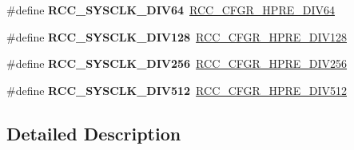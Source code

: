 \begin{DoxyCompactItemize}
\item 
\#define {\bfseries R\+C\+C\+\_\+\+S\+Y\+S\+C\+L\+K\+\_\+\+D\+I\+V64}~\hyperlink{group___peripheral___registers___bits___definition_ga1caeba8dc2b4c0bb11be600e983e3370}{R\+C\+C\+\_\+\+C\+F\+G\+R\+\_\+\+H\+P\+R\+E\+\_\+\+D\+I\+V64}\hypertarget{group___r_c_c___a_h_b___clock___source_ga73814b5a7ee000687ec8334637ca5b14}{}\label{group___r_c_c___a_h_b___clock___source_ga73814b5a7ee000687ec8334637ca5b14}

\item 
\#define {\bfseries R\+C\+C\+\_\+\+S\+Y\+S\+C\+L\+K\+\_\+\+D\+I\+V128}~\hyperlink{group___peripheral___registers___bits___definition_ga280da821f0da1bec1f4c0e132ddf8eab}{R\+C\+C\+\_\+\+C\+F\+G\+R\+\_\+\+H\+P\+R\+E\+\_\+\+D\+I\+V128}\hypertarget{group___r_c_c___a_h_b___clock___source_ga43eddf4d4160df30548a714dce102ad8}{}\label{group___r_c_c___a_h_b___clock___source_ga43eddf4d4160df30548a714dce102ad8}

\item 
\#define {\bfseries R\+C\+C\+\_\+\+S\+Y\+S\+C\+L\+K\+\_\+\+D\+I\+V256}~\hyperlink{group___peripheral___registers___bits___definition_ga089930cedd5b2cb201e717438f29d25b}{R\+C\+C\+\_\+\+C\+F\+G\+R\+\_\+\+H\+P\+R\+E\+\_\+\+D\+I\+V256}\hypertarget{group___r_c_c___a_h_b___clock___source_ga94956d6e9c3a78230bf660b838f987e2}{}\label{group___r_c_c___a_h_b___clock___source_ga94956d6e9c3a78230bf660b838f987e2}

\item 
\#define {\bfseries R\+C\+C\+\_\+\+S\+Y\+S\+C\+L\+K\+\_\+\+D\+I\+V512}~\hyperlink{group___peripheral___registers___bits___definition_gae5088dcbaefc55d4b6693e9b1e595ed0}{R\+C\+C\+\_\+\+C\+F\+G\+R\+\_\+\+H\+P\+R\+E\+\_\+\+D\+I\+V512}\hypertarget{group___r_c_c___a_h_b___clock___source_gabe18a9d55c0858bbfe3db657fb64c76d}{}\label{group___r_c_c___a_h_b___clock___source_gabe18a9d55c0858bbfe3db657fb64c76d}

\end{DoxyCompactItemize}


\subsection{Detailed Description}

